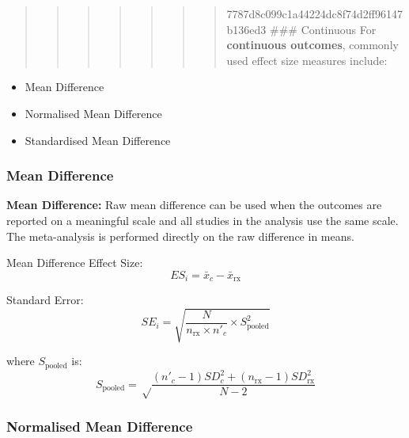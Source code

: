 \documentclass[
]{book}
\providecommand{\tightlist}{%
  \setlength{\itemsep}{0pt}\setlength{\parskip}{0pt}}
\begin{document}
\begin{quote}
\begin{quote}
\begin{quote}
\begin{quote}
\begin{quote}
\begin{quote}
\begin{quote}
7787d8c099c1a44224dc8f74d2ff96147b136ed3
\#\#\# Continuous
For \textbf{continuous outcomes}, commonly used effect size measures include:
\end{quote}
\end{quote}
\end{quote}
\end{quote}
\end{quote}
\end{quote}
\end{quote}

\begin{itemize}
\tightlist
\item
  Mean Difference
\item
  Normalised Mean Difference
\item
  Standardised Mean Difference
\end{itemize}

\hypertarget{mean-difference}{%
\subsubsection{Mean Difference}\label{mean-difference}}

\textbf{Mean Difference:} Raw mean difference can be used when the outcomes are reported on a meaningful scale and all studies in the analysis use the same scale. The meta-analysis is performed directly on the raw difference in means.

Mean Difference Effect Size:
\[ ES_i = \bar{x}_c - \bar{x}_\text{rx}\]

Standard Error:
\[ SE_i = \sqrt{\frac {N}{n_{\text{rx}} \times n'_c} \times S_{\text{pooled}}^2} \]

where \(S_{\text{pooled}}\) is:
\[S_{\text{pooled}} = \sqrt \frac {(n'_c - 1)SD_c^2 + (n_{\text{rx}} - 1)SD_{\text{rx}}^2}{N -2} \]

\hypertarget{normalised-mean-difference}{%
\subsubsection{Normalised Mean Difference}\label{normalised-mean-difference}}
\end{document}
